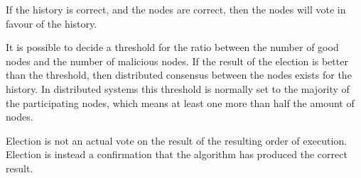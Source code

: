 	If the history is correct, and the nodes are correct, then the nodes will vote in favour of the history.
	
	It is possible to decide a threshold for the ratio between the number of good nodes and the number of malicious nodes. If the result of the election is better than the threshold, then distributed consensus between the nodes exists for the history. In distributed systems this threshold is normally set to the majority of the participating nodes, which means at least one more than half the amount of nodes.
	
	\newpar Election is not an actual vote on the result of the resulting order of execution. Election is instead a confirmation that the algorithm has produced the correct result. 
	
